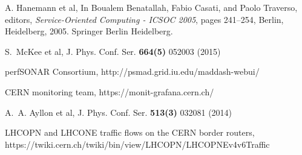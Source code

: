 \begin{thebibliography}{}
A. Hanemann et al, 
\newblock In Boualem Benatallah, Fabio Casati, and Paolo Traverso, editors,
  {\em Service-Oriented Computing - ICSOC 2005}, pages 241--254, Berlin, Heidelberg, 2005. Springer Berlin Heidelberg.

S.~McKee et al, J. Phys. Conf. Ser. {\bf 664(5)} 052003 (2015)


perfSONAR Consortium,
http://psmad.grid.iu.edu/maddash-webui/

CERN monitoring team,
https://monit-grafana.cern.ch/

A.~A. Ayllon et al, 
J. Phys. Conf. Ser. {\bf 513(3)} 032081 (2014)

LHCOPN and LHCONE traffic flows on the CERN border routers, 
https://twiki.cern.ch/twiki/bin/view/LHCOPN/LHCOPNEv4v6Traffic


 







\end{thebibliography}
